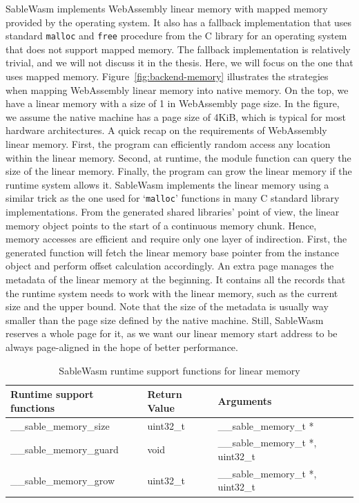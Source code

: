 SableWasm implements WebAssembly linear memory with mapped memory provided by the operating system. It also has a fallback implementation that uses standard \texttt{malloc} and \texttt{free} procedure from the C library for an operating system that does not support mapped memory. The fallback implementation is relatively trivial, and we will not discuss it in the thesis. Here, we will focus on the one that uses mapped memory. Figure~\ref{fig:backend-memory} illustrates the strategies when mapping WebAssembly linear memory into native memory. On the top, we have a linear memory with a size of 1 in WebAssembly page size. In the figure, we assume the native machine has a page size of 4KiB, which is typical for most hardware architectures. A quick recap on the requirements of WebAssembly linear memory. First, the program can efficiently random access any location within the linear memory. Second, at runtime, the module function can query the size of the linear memory. Finally, the program can grow the linear memory if the runtime system allows it. SableWasm implements the linear memory using a similar trick as the one used for `\texttt{malloc}' functions in many C standard library implementations. From the generated shared libraries' point of view, the linear memory object points to the start of a continuous memory chunk. Hence, memory accesses are efficient and require only one layer of indirection. First, the generated function will fetch the linear memory base pointer from the instance object and perform offset calculation accordingly. An extra page manages the metadata of the linear memory at the beginning. It contains all the records that the runtime system needs to work with the linear memory, such as the current size and the upper bound. Note that the size of the metadata is usually way smaller than the page size defined by the native machine. Still, SableWasm reserves a whole page for it, as we want our linear memory start address to be always page-aligned in the hope of better performance.

\begin{table}[h]
    \centering
    \begin{tabular}{|l|l|l|}
        \hline
        \textbf{Runtime support functions} & \textbf{Return Value} & \textbf{Arguments}                \\ \hline
        \_\_sable\_memory\_size            & uint32\_t             & \_\_sable\_memory\_t *            \\ \hline
        \_\_sable\_memory\_guard           & void                  & \_\_sable\_memory\_t *, uint32\_t \\ \hline
        \_\_sable\_memory\_grow            & uint32\_t             & \_\_sable\_memory\_t *, uint32\_t \\ \hline
    \end{tabular}
    \caption{SableWasm runtime support functions for linear memory}
    \label{tbl:sablewasm-runtime-memory-api}
\end{table}


